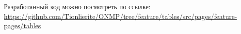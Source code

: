 
Разработанный код можно посмотреть по ссылке: \url{https://github.com/Tionlierite/ONMP/tree/feature/tables/src/pages/feature-pages/tables}
